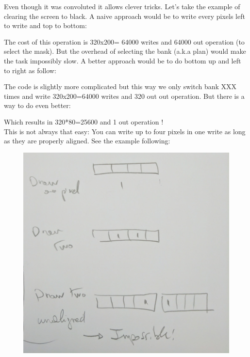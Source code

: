 \documentclass[book.tex]{subfiles}
\begin{document}
Even though it was convoluted it allows clever tricks. Let's take the example of clearing the screen to black. A naive approach would be to write every pixels left to write and top to bottom:




The cost of this operation is 320x200= 64000 writes and 64000 out operation (to select the mask).
But the overhead of selecting the bank (a.k.a plan) would make the task impossibly slow. A better approach would be to do bottom up and left to right as follow:



The code is slightly more complicated but this way we only switch bank XXX times and write 320x200=64000 writes and  320 out out operation. But there is a way to do even better: 



Which results in 320*80=25600 and 1 out operation !\\

This is not always that easy: You can write up to four pixels in one write as long as they are properly aligned. See the example following:
\begin{figure}[H]
  \centering
 \includegraphics[scale=0.3]{imgs//vga_multiple_pixel_write.png}
\end{figure}
\end{document}

